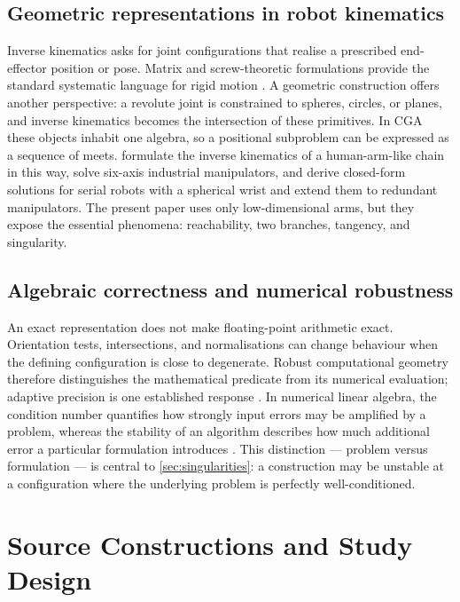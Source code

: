 \documentclass[11pt,a4paper]{article}
\theoremstyle{plain}
\theoremstyle{definition}
\theoremstyle{remark}
\begin{document}
\subsection{Geometric representations in robot kinematics}

Inverse kinematics asks for joint configurations that realise a prescribed
end-effector position or pose. Matrix and screw-theoretic formulations provide
the standard systematic language for rigid motion \citep{murray1994}. A
geometric construction offers another perspective: a revolute joint is
constrained to spheres, circles, or planes, and inverse kinematics becomes the
intersection of these primitives. In CGA these objects inhabit one algebra, so a
positional subproblem can be expressed as a sequence of meets.
\citet{hildenbrand2008} formulate the inverse kinematics of a human-arm-like
chain in this way, \citet{kleppe2016} solve six-axis industrial manipulators,
and \citet{zaplana2022} derive closed-form solutions for serial robots with a
spherical wrist and extend them to redundant manipulators. The present paper
uses only low-dimensional arms, but they expose the essential phenomena:
reachability, two branches, tangency, and singularity.

\subsection{Algebraic correctness and numerical robustness}

An exact representation does not make floating-point arithmetic exact.
Orientation tests, intersections, and normalisations can change behaviour when
the defining configuration is close to degenerate. Robust computational
geometry therefore distinguishes the mathematical predicate from its numerical
evaluation; adaptive precision is one established response
\citep{shewchuk1997}. In numerical linear algebra, the condition number
quantifies how strongly input errors may be amplified by a problem, whereas the
stability of an algorithm describes how much additional error a particular
formulation introduces \citep{higham2002}. This distinction --- problem versus
formulation --- is central to \cref{sec:singularities}: a construction may be
unstable at a configuration where the underlying problem is perfectly
well-conditioned.

\section{Source Constructions and Study Design}\label{sec:source}
\end{document}
